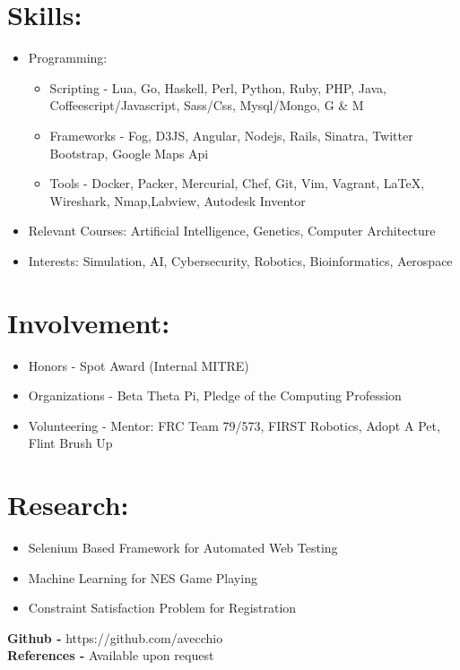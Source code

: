 \documentclass{res}
\begin{document}
\section{Skills:}
\begin{itemize}
\item Programming:
\begin{itemize}[label=$\circ$]
\item Scripting - Lua, Go, Haskell, Perl, Python, Ruby, PHP, Java, Coffeescript/Javascript, Sass/Css, Mysql/Mongo, G \& M
\item Frameworks - Fog, D3JS, Angular, Nodejs, Rails, Sinatra, Twitter Bootstrap, Google Maps Api
\item Tools - Docker, Packer, Mercurial, Chef, Git, Vim, Vagrant, \LaTeX, Wireshark, Nmap,Labview, Autodesk Inventor
\end{itemize}
\item Relevant Courses: Artificial Intelligence, Genetics, Computer Architecture
\item Interests: Simulation, AI, Cybersecurity, Robotics, Bioinformatics, Aerospace
\end{itemize}

\section{Involvement:}
\begin{itemize}
\item Honors - Spot Award (Internal MITRE)
\item Organizations - Beta Theta Pi, Pledge of the Computing Profession
\item Volunteering - Mentor: FRC Team 79/573, FIRST Robotics, Adopt A Pet, Flint Brush Up
\end{itemize}

\section{Research:}
\begin{itemize}
\item Selenium Based Framework for Automated Web Testing
\item Machine Learning for NES Game Playing
\item Constraint Satisfaction Problem for Registration
\end{itemize}

\begin{center}
\textbf{Github - }https://github.com/avecchio\\
\textbf{References - }Available upon request
\end{center}
\end{document}
